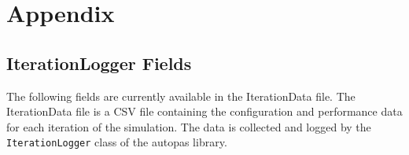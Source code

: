 \chapter{Appendix}

\printglossaries

\newpage


\section{IterationLogger Fields}
\label{des:iterationdatafields}

The following fields are currently available in the IterationData file. The IterationData file is a CSV file containing the configuration and performance data for each iteration of the simulation. The data is collected and logged by the \texttt{IterationLogger} class of the \gls{autopas} library.

